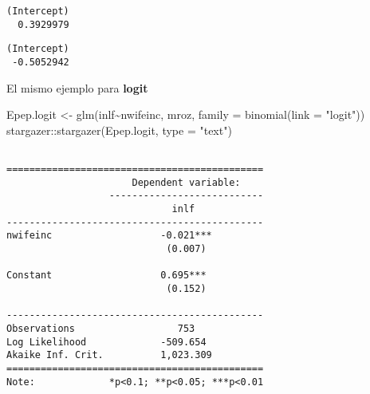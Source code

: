 \documentclass[
  letterpaper,
  DIV=11,
  numbers=noendperiod]{scrreprt}
\newenvironment{Shaded}{\begin{snugshade}}{\end{snugshade}}
\newcommand{\AttributeTok}[1]{\textcolor[rgb]{0.40,0.45,0.13}{#1}}
\newcommand{\CommentTok}[1]{\textcolor[rgb]{0.37,0.37,0.37}{#1}}
\newcommand{\DecValTok}[1]{\textcolor[rgb]{0.68,0.00,0.00}{#1}}
\newcommand{\FunctionTok}[1]{\textcolor[rgb]{0.28,0.35,0.67}{#1}}
\newcommand{\NormalTok}[1]{\textcolor[rgb]{0.00,0.23,0.31}{#1}}
\newcommand{\OtherTok}[1]{\textcolor[rgb]{0.00,0.23,0.31}{#1}}
\newcommand{\SpecialCharTok}[1]{\textcolor[rgb]{0.37,0.37,0.37}{#1}}
\newcommand{\StringTok}[1]{\textcolor[rgb]{0.13,0.47,0.30}{#1}}
\begin{document}
\begin{verbatim}
(Intercept) 
  0.3929979 
\end{verbatim}

\begin{Shaded}
\end{Shaded}

\begin{verbatim}
(Intercept) 
 -0.5052942 
\end{verbatim}

El mismo ejemplo para \textbf{logit}

\begin{Shaded}
\begin{Highlighting}[]
\NormalTok{Epep.logit }\OtherTok{\textless{}{-}} \FunctionTok{glm}\NormalTok{(inlf}\SpecialCharTok{\textasciitilde{}}\NormalTok{nwifeinc,}
\NormalTok{                  mroz, }
                  \AttributeTok{family =} \FunctionTok{binomial}\NormalTok{(}\AttributeTok{link =} \StringTok{"logit"}\NormalTok{)) }
\NormalTok{stargazer}\SpecialCharTok{::}\FunctionTok{stargazer}\NormalTok{(Epep.logit, }\AttributeTok{type =} \StringTok{"text"}\NormalTok{)}
\end{Highlighting}
\end{Shaded}

\begin{verbatim}

=============================================
                      Dependent variable:    
                  ---------------------------
                             inlf            
---------------------------------------------
nwifeinc                   -0.021***         
                            (0.007)          
                                             
Constant                   0.695***          
                            (0.152)          
                                             
---------------------------------------------
Observations                  753            
Log Likelihood             -509.654          
Akaike Inf. Crit.          1,023.309         
=============================================
Note:             *p<0.1; **p<0.05; ***p<0.01
\end{verbatim}
\end{document}
